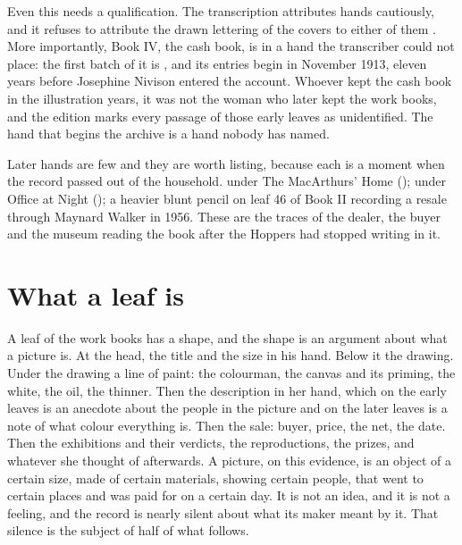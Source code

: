 Even this needs a qualification. The transcription attributes hands cautiously, and it refuses to attribute the drawn lettering of the covers to either of them . More importantly, Book IV, the cash book, is in a hand the transcriber could not place: the first batch of it is , and its entries begin in November 1913, eleven years before Josephine Nivison entered the account. Whoever kept the cash book in the illustration years, it was not the woman who later kept the work books, and the edition marks every passage of those early leaves as unidentified. The hand that begins the archive is a hand nobody has named.

Later hands are few and they are worth listing, because each is a moment when the record passed out of the household.  under The MacArthurs' Home ();  under Office at Night (); a heavier blunt pencil on leaf 46 of Book II recording a resale through Maynard Walker in 1956. These are the traces of the dealer, the buyer and the museum reading the book after the Hoppers had stopped writing in it.

\section{What a leaf is}

A leaf of the work books has a shape, and the shape is an argument about what a picture is. At the head, the title and the size in his hand. Below it the drawing. Under the drawing a line of paint: the colourman, the canvas and its priming, the white, the oil, the thinner. Then the description in her hand, which on the early leaves is an anecdote about the people in the picture and on the later leaves is a note of what colour everything is. Then the sale: buyer, price,  the net, the date. Then the exhibitions and their verdicts, the reproductions, the prizes, and whatever she thought of afterwards. A picture, on this evidence, is an object of a certain size, made of certain materials, showing certain people, that went to certain places and was paid for on a certain day. It is not an idea, and it is not a feeling, and the record is nearly silent about what its maker meant by it. That silence is the subject of half of what follows.

